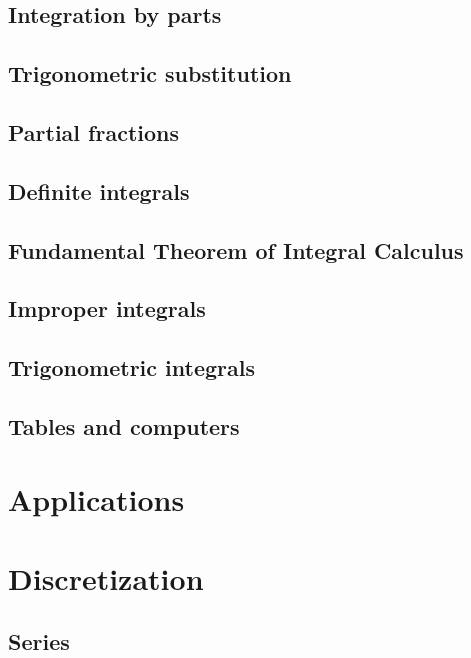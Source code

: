 \documentclass[twoside,openright,titlepage,a4paper]{book}
\begin{document}
\begin{sloppypar}
\section{Integration by parts} \label{ChIntegrationSecIntegrationByParts}
\section{Trigonometric substitution} \label{ChIntegrationSecTrigonometricSubstitution}
\section{Partial fractions} \label{ChIntegrationSecPartialFractions}
\section{Definite integrals} \label{ChIntegrationSecDefiniteIntegrals}
\section{Fundamental Theorem of Integral Calculus} \label{ChIntegrationSecFundamentalTheoremOfIntegralCalculus}
\section{Improper integrals} \label{ChIntegrationSecImproperIntegrals}
\section{Trigonometric integrals} \label{ChIntegrationSecTrigonometricIntegrals}
\section{Tables and computers} \label{ChIntegrationSecTablesAndComputers}

\chapter{Applications} \label{ChApplications}

\chapter{Discretization} \label{ChDiscretization}
\section{Series} \label{ChDiscretizationSecSeries}

\end{sloppypar}
\end{document}
